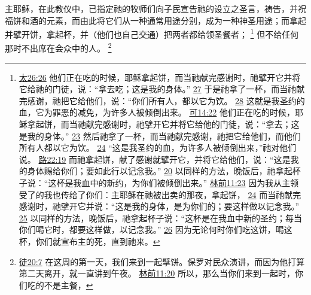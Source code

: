 \documentclass[12pt, a4paper, oneside]{ctexart}
\newcounter{parnum}[section]
\newcommand{\N}{%
   \noindent\refstepcounter{parnum}%
    \makebox[\parindent][l]{\textbf{\arabic{parnum}.}}}
\begin{document}
\N 主耶稣，在此教仪中，已指定祂的牧师们向子民宣告祂的设立之圣言，祷告，并祝福饼和酒的元素，而由此将它们从一种通常用途分别，成为一种神圣用途；而拿起并擘开饼，拿起杯，并（他们也自己交通）把两者都给领圣餐者；
	\footnote {
		\href{https://biblehub.com/matthew/26-26.htm}{太26:26} 他们正在吃的时候，耶稣拿起饼，而当祂献完感谢时，祂擘开它并将它给祂的门徒，说：“拿去吃；这是我的身体。”
		\href{https://biblehub.com/matthew/26-27.htm}{27} 于是祂拿了一杯，而当祂献完感谢，祂把它给他们，说：“你们所有人，都以它为饮。
		\href{https://biblehub.com/matthew/26-28.htm}{28} 这就是我圣约的血，它为罪恶的减免，为许多人被倾倒出来。
		\href{https://biblehub.com/mark/14-22.htm}{可14:22} 他们正在吃的时候，耶稣拿起饼，而当祂献完感谢时，祂擘开它并将它给他的门徒，说：“拿去；这是我的身体。”
		\href{https://biblehub.com/mark/14-23.htm}{23} 然后祂拿了一杯，而当祂献完感谢，祂把它给他们，而他们所有人都以它为饮。
		\href{https://biblehub.com/mark/14-24.htm}{24} “这是我圣约的血，为许多人被倾倒出来，”祂对他们说。
		\href{https://biblehub.com/luke/22-19.htm}{路22:19} 而祂拿起饼，献了感谢就擘开它，并将它给他们，说：“这是我的身体赐给你们；要如此行以记念我。”
		\href{https://biblehub.com/luke/22-20.htm}{20} 以同样的方法，晚饭后，祂拿起杯子说：“这杯是我血中的新约，为你们被倾倒出来。”
		\href{https://biblehub.com/1_corinthians/11-23.htm}{林前11:23} 因为我从主领受了的我也传给了你们：主耶稣在祂被出卖的那夜，拿起饼，
		\href{https://biblehub.com/1_corinthians/11-24.htm}{24} 而当祂献完感谢时，祂擘开它并说：“这是我的身体，是为你们的；要这样做以记念我。”
		\href{https://biblehub.com/1_corinthians/11-25.htm}{25} 以同样的方法，晚饭后，祂拿起杯子说：“这杯是在我血中新的圣约；每当你们喝它时，都要这样做，以记念我。”
		\href{https://biblehub.com/1_corinthians/11-26.htm}{26} 因为无论何时你们吃这饼，喝这杯，你们就宣布主的死，直到祂来。
	}
	但不给任何那时不出席在会众中的人。
	\footnote {
		\href{https://biblehub.com/acts/20-7.htm}{徒20:7} 在这周的第一天，我们来到一起擘饼。保罗对民众演讲，而因为他打算第二天离开，就一直讲到午夜。
		\href{https://biblehub.com/1_corinthians/11-20.htm}{林前11:20} 所以，那么当你们来到一起时，你们吃的不是主餐，
	}
\end{document}
